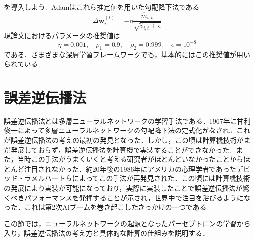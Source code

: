 \documentclass[a4paper,11pt]{jsreport}
\begin{document}
を導入しよう．Adamはこれら推定値を用いた勾配降下法である
\begin{equation}
  \Delta \bm{w}_i^{(t)}
  = -\eta \frac{\hat{m}_{i,t}}{\sqrt{\hat{v}_{i,t} + \epsilon}}
\end{equation}
現論文におけるパラメータの推奨値は
\begin{equation}
  \eta = 0.001, \quad \rho_1 = 0.9, \quad \rho_2 = 0.999, \quad \epsilon = 10^{-8}
\end{equation}
である．さまざまな深層学習フレームワークでも，基本的にはこの推奨値が用いられている．

\section{誤差逆伝播法}
誤差逆伝播法とは多層ニューラルネットワークの学習手法である．1967年に甘利俊一によって多層ニューラルネットワークの勾配降下法の定式化がなされ，これが誤差逆伝播法の考えの最初の発見となった\cite{4039068}．しかし，この頃は計算機技術がまだ発展しておらず，誤差逆伝播法を計算機で実装することができなかった．また，当時この手法がうまくいくと考える研究者がほとんどいなかったことからほとんど注目されなかった．約20年後の1986年にアメリカの心理学者であったデビッド・ラメルハートらによってこの手法が再発見された．この頃には計算機技術の発展により実装が可能になっており，実際に実装したことで誤差逆伝播法が驚くべきパフォーマンスを発揮することが示され，世界中で注目を浴びるようになった．これは第2次AIブームを巻き起こしたきっかけの一つである．\par
この節では，ニューラルネットワークの起源となったパーセプトロンの学習から入り，誤差逆伝播法の考え方と具体的な計算の仕組みを説明する．
\end{document}
